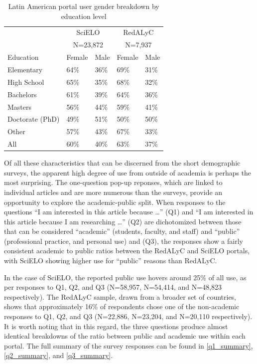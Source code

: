 \begin{table}[!htbp]
\centering
\caption{Latin American portal user gender breakdown by education level} \label{demographic_education_gender}
\begin{tabular}{@{}lllll@{}}
\toprule
            & \multicolumn{2}{c}{SciELO}        &\multicolumn{2}{c}{RedALyC} \\
            & \multicolumn{2}{c}{N=23,872}  &   \multicolumn{2}{c}{N=7,937} \\ \cmidrule{2-5}
Education   &   Female  &   Male            &   Female  &   Male \\ \midrule
Elementary  &   64\%    &   36\%            &   69\%    &   31\% \\
High School &   65\%    &   35\%            &   68\%    &   32\% \\
Bachelors   &   61\%    &   39\%            &   64\%    &   36\% \\
Masters &   56\%    &   44\%    &   59\%    &   41\% \\
Doctorate (PhD) &   49\%    &   51\%    &   50\%    &   50\% \\
Other   &   57\%    &   43\%    &   67\%    &   33\% \\ \midrule
All &   60\%    &   40\%    &   63\%    &   37\% \\ \bottomrule
\end{tabular}
\end{table}




Of all these characteristics that can be discerned from the short demographic surveys, the apparent high degree of use from outside of academia is perhaps the most surprising. The one-question pop-up reponses, which are linked to individual articles and are more numerous than the surveys, provide an opportunity to explore the academic-public split. When responses to the questions ``I am interested in this article because {\ldots}'' (Q1) and ``I am interested in this article because I am researching {\ldots}'' (Q2) are dichotomized between those that can be considered ``academic'' (students, faculty, and staff) and ``public'' (professional practice, and personal use) and (Q3), the responses show a fairly consistent academic to public ratios between the RedALyC and SciELO portals, with SciELO showing higher use for ``public'' reasons than RedALyC.

In the case of SciELO, the reported public use hovers around 25\% of all use, as per responses to Q1, Q2, and Q3 (N=58,957, N=54,414, and N=48,823 respectively). The RedALyC sample, drawn from a broader set of countries, shows that approximately 16\% of respondents chose one of the non-academic responses to Q1, Q2, and Q3 (N=22,886, N=23,204, and N=20,110 respectively). It is worth noting that in this regard, the three questions produce almost identical breakdowns of the ratio between public and academic use within each portal. The full summary of the survey responses can be found in \autoref{q1_summary}, \autoref{q2_summary}, and \autoref{q3_summary}.



